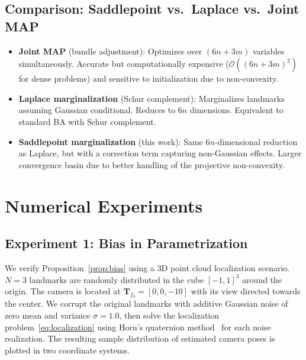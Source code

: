 \documentclass[journal]{IEEEtran}
\begin{document}
\subsection{Comparison: Saddlepoint vs.\ Laplace vs.\ Joint MAP}

\begin{itemize}
\item \textbf{Joint MAP} (bundle adjustment): 
Optimizes over $(6n + 3m)$ variables simultaneously. 
Accurate but computationally expensive ($\mathcal{O}((6n+3m)^2)$ 
for dense problems) and sensitive to initialization 
due to non-convexity.

\item \textbf{Laplace marginalization} (Schur complement): 
Marginalizes landmarks assuming Gaussian conditional. 
Reduces to $6n$ dimensions. Equivalent to standard 
BA with Schur complement.

\item \textbf{Saddlepoint marginalization} (this work): 
Same $6n$-dimensional reduction as Laplace, but with 
a correction term capturing non-Gaussian effects. 
Larger convergence basin due to better handling of 
the projective non-convexity.
\end{itemize}

\section{Numerical Experiments}
\label{sec:experiments}

\subsection{Experiment 1: Bias in Parametrization}

We verify Proposition~\ref{prop:bias} using a 
3D point cloud localization scenario. $N = 3$ landmarks are
randomly distributed in the cube $[-1,1]^3$ around the origin.
The camera is located at $\mathbf{T}_{f_0} = [0,0,-10]$ with 
its view directed towards the center. We corrupt the original 
landmarks with additive Gaussian noise of zero mean and 
variance $\sigma = 1.0$, then solve the localization 
problem~\eqref{eq:localization} using Horn's quaternion 
method~\cite{Horn87} for each noise realization.
The resulting sample distribution of estimated camera poses 
is plotted in two coordinate systems.
\end{document}
